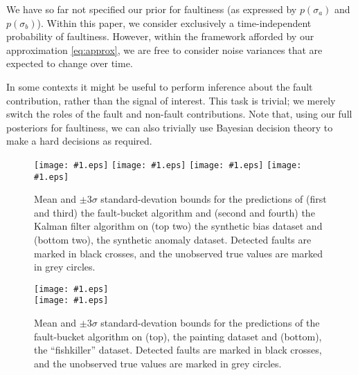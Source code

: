 \documentclass{article}
\newcommand{\psff}[1]{\texttt{[image: \#1.eps]}}
\begin{document}
We have so far not specified our prior for faultiness (as expressed by
$p(\sigma_a)$ and $p(\sigma_b)$). Within this paper, we consider
exclusively a time-independent probability of faultiness. However,
within the framework afforded by our approximation \eqref{eq:approx},
we are free to consider noise variances that are expected to change
over time.

In some contexts it might be useful to perform inference about the
fault contribution, rather than the signal of interest.  This task is
trivial; we merely switch the roles of the fault and non-fault
contributions. Note that, using our full posteriors for faultiness, we can also trivially use Bayesian decision theory to make a hard decisions as required.

\begin{figure*}
  \centering
  \small
  \psff{bias}
  \psff{kf_bias}
  \vspace*{2\baselineskip}
  \psff{dynamics}
  \psff{kf_dynamics}
  \caption{Mean and $\pm3\sigma$ standard-devation bounds for the
    predictions of (first and third) the fault-bucket algorithm and
    (second and fourth) the Kalman filter algorithm on (top two) the
    synthetic bias dataset and (bottom two), the synthetic anomaly
    dataset.  Detected faults are marked in black crosses, and the
    unobserved true values are marked in grey circles.}
  \label{compare}
\end{figure*}

\begin{figure*}
  \centering
  \small
\hspace{-2.8cm}\psff{painting} \\
\hspace{-2.8cm}\psff{fishkiller}
  \caption{Mean and $\pm3\sigma$ standard-devation bounds for the
    predictions of the fault-bucket algorithm on (top), the painting
    dataset and (bottom), the ``fishkiller'' dataset.  Detected faults are
    marked in black crosses, and the unobserved true values are marked
    in grey circles.}
  \label{justfb}
\end{figure*}

\end{document}
